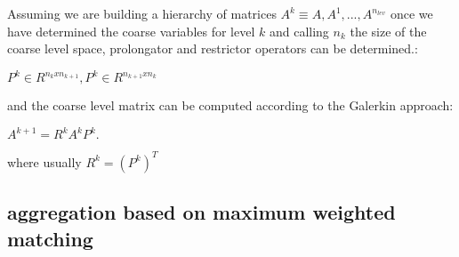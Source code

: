 \documentclass[conference]{IEEEtran}
\begin{document}
Assuming we are building a hierarchy of matrices $A^{k} \equiv A, A^{1},..., A^{n_{lev}} $ once we have determined the coarse variables for level $k$ and calling $n_k$ the size of the coarse level space, prolongator and restrictor operators can be determined.:

\begin{math}
P^{k} \in R^{n_k x n_{k+1}} ,  P^{k} \in R^{n_{k+1} x n_{k}} 
\end{math}

and the coarse level matrix can be computed according to the Galerkin approach:
  
\begin{math}
A^{k+1} =  R^{k} A^{k} P^{k}. 
\end{math}

where usually $R^{k}=(P^{k})^{T} $ 

\subsection{aggregation based on maximum weighted matching}
\end{document}

